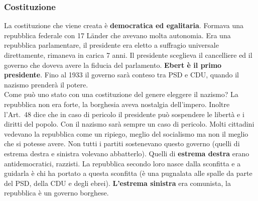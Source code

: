 \subsubsection{Costituzione}
La costituzione che viene creata è \textbf{democratica ed egalitaria}. Formava una repubblica 
federale con 17 Länder che avevano molta autonomia. Era una repubblica parlamentare, il presidente 
era eletto a suffragio universale direttamente, rimaneva in carica 7 anni. Il presidente sceglieva
il cancelliere ed il governo che doveva avere la fiducia del parlamento. \textbf{Ebert è il primo
presidente}. Fino al 1933 il governo sarà conteso tra PSD e CDU, quando il nazismo prenderà il 
potere.\\
Come può uno stato con una costituzione del genere eleggere il nazismo? La repubblica non era forte,
la borghesia aveva nostalgia dell'impero. Inoltre l'Art.\ 48 dice che in caso di pericolo il 
presidente può sospendere le libertà e i diritti del popolo. Con il nazismo sarà sempre un caso di
pericolo. Molti cittadini vedevano la repubblica come un ripiego, meglio del socialismo ma non il
meglio che si potesse avere. Non tutti i partiti sostenevano questo governo (quelli di estrema destra
e sinistra volevano abbatterlo). Quelli di \textbf{estrema destra} erano antidemocratici, razzisti. 
La repubblica secondo loro nasce dalla sconfitta e a guidarla è chi ha portato a questa sconfitta
(è una pugnalata alle spalle da parte del PSD, della CDU e degli ebrei). \textbf{L'estrema sinistra}
era comunista, la repubblica è un governo borghese.

